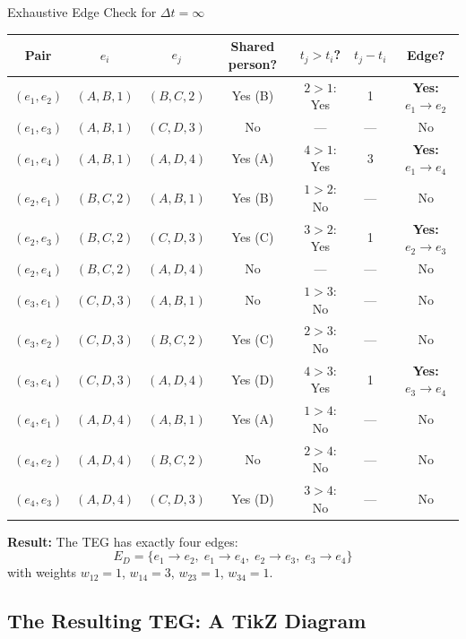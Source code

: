 \begin{examplebox}{Exhaustive Edge Check for $\Delta t = \infty$}
\small
\begin{center}
\begin{tabular}{ccccccc}
\toprule
\textbf{Pair} & $e_i$ & $e_j$ & \textbf{Shared person?} & $t_j > t_i$? & $t_j - t_i$ & \textbf{Edge?} \\
\midrule
$(e_1, e_2)$ & $(A,B,1)$ & $(B,C,2)$ & Yes (B) & $2>1$: Yes & 1 & \textbf{Yes: $e_1 \to e_2$} \\
$(e_1, e_3)$ & $(A,B,1)$ & $(C,D,3)$ & No      & ---        & --- & No \\
$(e_1, e_4)$ & $(A,B,1)$ & $(A,D,4)$ & Yes (A) & $4>1$: Yes & 3 & \textbf{Yes: $e_1 \to e_4$} \\
$(e_2, e_1)$ & $(B,C,2)$ & $(A,B,1)$ & Yes (B) & $1>2$: No  & --- & No \\
$(e_2, e_3)$ & $(B,C,2)$ & $(C,D,3)$ & Yes (C) & $3>2$: Yes & 1 & \textbf{Yes: $e_2 \to e_3$} \\
$(e_2, e_4)$ & $(B,C,2)$ & $(A,D,4)$ & No      & ---        & --- & No \\
$(e_3, e_1)$ & $(C,D,3)$ & $(A,B,1)$ & No      & $1>3$: No  & --- & No \\
$(e_3, e_2)$ & $(C,D,3)$ & $(B,C,2)$ & Yes (C) & $2>3$: No  & --- & No \\
$(e_3, e_4)$ & $(C,D,3)$ & $(A,D,4)$ & Yes (D) & $4>3$: Yes & 1 & \textbf{Yes: $e_3 \to e_4$} \\
$(e_4, e_1)$ & $(A,D,4)$ & $(A,B,1)$ & Yes (A) & $1>4$: No  & --- & No \\
$(e_4, e_2)$ & $(A,D,4)$ & $(B,C,2)$ & No      & $2>4$: No  & --- & No \\
$(e_4, e_3)$ & $(A,D,4)$ & $(C,D,3)$ & Yes (D) & $3>4$: No  & --- & No \\
\bottomrule
\end{tabular}
\end{center}

\medskip
\noindent\textbf{Result:} The TEG has exactly four edges:
\[
    E_D = \{ e_1 \to e_2,\; e_1 \to e_4,\; e_2 \to e_3,\; e_3 \to e_4 \}
\]
with weights $w_{12}=1$, $w_{14}=3$, $w_{23}=1$, $w_{34}=1$.
\end{examplebox}

\subsection{The Resulting TEG: A TikZ Diagram}

